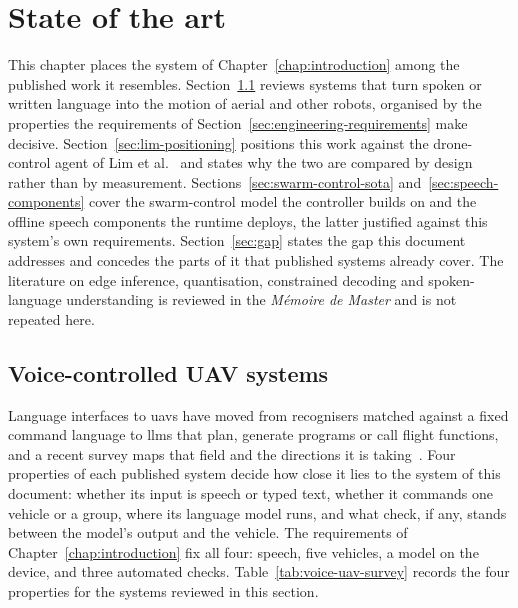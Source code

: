 %

\chapter{State of the art}
\label{chap:state-of-the-art}
This chapter places the system of Chapter~\ref{chap:introduction} among the published work it
resembles. Section~\ref{sec:voice-uav} reviews systems that turn spoken or written language into
the motion of aerial and other robots, organised by the properties the requirements of
Section~\ref{sec:engineering-requirements} make decisive. Section~\ref{sec:lim-positioning}
positions this work against the drone-control agent of Lim et al.~\cite{lim2025} and states why
the two are compared by design rather than by measurement. Sections~\ref{sec:swarm-control-sota}
and~\ref{sec:speech-components} cover the swarm-control model the controller builds on and the
offline speech components the runtime deploys, the latter justified against this system's own
requirements. Section~\ref{sec:gap} states the gap this document addresses and concedes the parts
of it that published systems already cover. The literature on edge inference, quantisation,
constrained decoding and spoken-language understanding is reviewed in the \emph{M\'emoire de
Master} and is not repeated here.

\section{Voice-controlled UAV systems}
\label{sec:voice-uav}
Language interfaces to \glspl{uav} have moved from recognisers matched against a fixed command
language to \glspl{llm} that plan, generate programs or call flight functions, and a
recent survey maps that field and the directions it is taking~\cite{javaid2024}. Four properties of
each published system decide how close it lies to the system of this document: whether its input is
speech or typed text, whether it commands one vehicle or a group, where its language model runs,
and what check, if any, stands between the model's output and the vehicle. The requirements of
Chapter~\ref{chap:introduction} fix all four: speech, five vehicles, a model on the device, and
three automated checks. Table~\ref{tab:voice-uav-survey} records the four properties for the
systems reviewed in this section.

